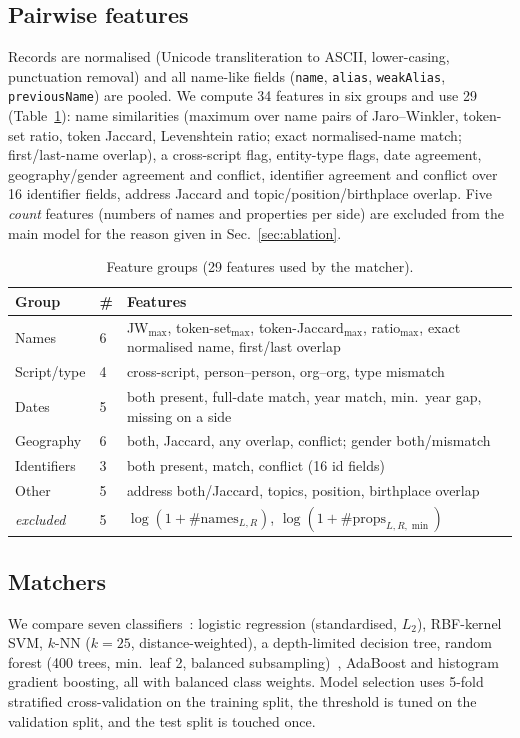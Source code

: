 \documentclass[conference]{IEEEtran}
\begin{document}
\subsection{Pairwise features}
Records are normalised (Unicode transliteration to ASCII, lower-casing, punctuation removal) and all name-like fields (\texttt{name}, \texttt{alias}, \texttt{weakAlias}, \texttt{previousName}) are pooled. We compute 34 features in six groups and use 29 (Table~\ref{tab:feats}): name similarities (maximum over name pairs of Jaro--Winkler, token-set ratio, token Jaccard, Levenshtein ratio; exact normalised-name match; first/last-name overlap), a cross-script flag, entity-type flags, date agreement, geography/gender agreement and conflict, identifier agreement and conflict over 16 identifier fields, address Jaccard and topic/position/birthplace overlap. Five \emph{count} features (numbers of names and properties per side) are excluded from the main model for the reason given in Sec.~\ref{sec:ablation}.

\begin{table}[t]
\caption{Feature groups (29 features used by the matcher).}
\label{tab:feats}
\centering\scriptsize
\begin{tabular}{@{}llp{4.3cm}@{}}
\toprule
Group & \# & Features \\
\midrule
Names & 6 & JW$_{\max}$, token-set$_{\max}$, token-Jaccard$_{\max}$, ratio$_{\max}$, exact normalised name, first/last overlap\\
Script/type & 4 & cross-script, person--person, org--org, type mismatch\\
Dates & 5 & both present, full-date match, year match, min.\ year gap, missing on a side\\
Geography & 6 & both, Jaccard, any overlap, conflict; gender both/mismatch\\
Identifiers & 3 & both present, match, conflict (16 id fields)\\
Other & 5 & address both/Jaccard, topics, position, birthplace overlap\\
\textit{excluded} & 5 & $\log(1{+}\#\text{names}_{L,R})$, $\log(1{+}\#\text{props}_{L,R,\min})$\\
\bottomrule
\end{tabular}
\end{table}

\subsection{Matchers}
We compare seven classifiers~\cite{pedregosa2011sklearn}: logistic regression (standardised, $L_2$), RBF-kernel SVM, $k$-NN ($k{=}25$, distance-weighted), a depth-limited decision tree, random forest (400 trees, min.\ leaf 2, balanced subsampling)~\cite{breiman2001rf}, AdaBoost and histogram gradient boosting, all with balanced class weights. Model selection uses 5-fold stratified cross-validation on the training split, the threshold is tuned on the validation split, and the test split is touched once.
\end{document}
